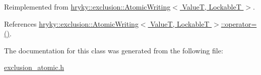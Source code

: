 Reimplemented from \hyperlink{group__exclusion__control_ga593ba1b3b563f04eeac4e468b77f7009}{hryky\-::exclusion\-::\-Atomic\-Writing$<$ Value\-T, Lockable\-T $>$}.



References \hyperlink{group__exclusion__control_ga4e15c7309396df54b08bf6d62c91ea98}{hryky\-::exclusion\-::\-Atomic\-Writing$<$ Value\-T, Lockable\-T $>$\-::operator=()}.



The documentation for this class was generated from the following file\-:\begin{DoxyCompactItemize}
\item 
\hyperlink{exclusion__atomic_8h}{exclusion\-\_\-atomic.\-h}\end{DoxyCompactItemize}
